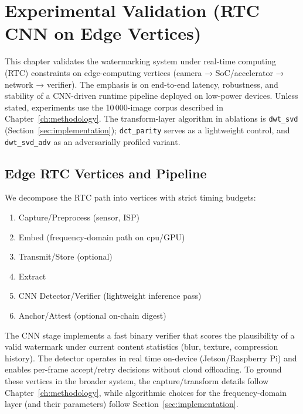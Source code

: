 \chapter{Experimental Validation (RTC CNN on Edge Vertices)}
\label{ch:exp}

This chapter validates the watermarking system under real-time computing (RTC) constraints on edge-computing vertices (camera → SoC/accelerator → network → verifier).
The emphasis is on end-to-end latency, robustness, and stability of a CNN-driven runtime pipeline deployed on low-power devices.
Unless stated, experiments use the 10\,000-image corpus described in Chapter~\ref{ch:methodology}.
The transform-layer algorithm in ablations is \texttt{dwt\_svd} (Section~\ref{sec:implementation}); \texttt{dct\_parity} serves as a lightweight control, and \texttt{dwt\_svd\_adv} as an adversarially profiled variant.

\section{Edge RTC Vertices and Pipeline}
\label{sec:validation:pipeline}

We decompose the RTC path into vertices with strict timing budgets:
\begin{enumerate}
    \item Capture/Preprocess (sensor, ISP)
    \item Embed (frequency-domain path on \gls{cpu}/GPU)
    \item Transmit/Store (optional)
    \item Extract
    \item CNN Detector/Verifier (lightweight inference pass)
    \item Anchor/Attest (optional on-chain digest)
\end{enumerate}

The CNN stage implements a fast binary verifier that scores the plausibility of a valid watermark under current content statistics (blur, texture, compression history).
The detector operates in real time on-device (Jetson/Raspberry Pi) and enables per-frame accept/retry decisions without cloud offloading.
To ground these vertices in the broader system, the capture/transform details follow Chapter~\ref{ch:methodology}, while algorithmic choices for the frequency-domain layer (and their parameters) follow Section~\ref{sec:implementation}.


